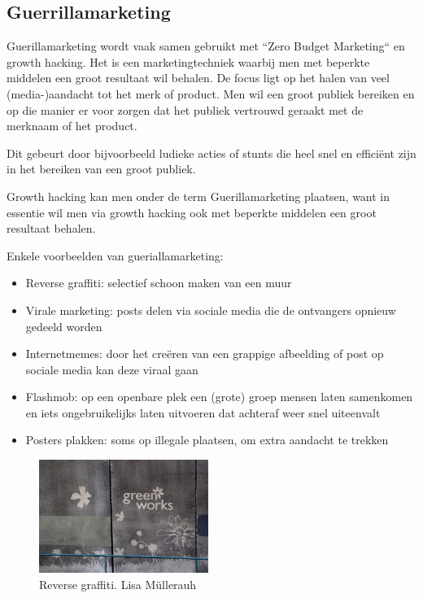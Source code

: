 \subsection{Guerrillamarketing} \label{subsec:guerrillamarketing}
Guerillamarketing wordt vaak samen gebruikt met ``Zero Budget Marketing`` en growth hacking. Het is een marketingtechniek waarbij men met beperkte middelen een groot resultaat wil behalen. De focus ligt op het halen van veel (media-)aandacht tot het merk of product. Men wil een groot publiek bereiken en op die manier er voor zorgen dat het publiek vertrouwd geraakt met de merknaam of het product.

Dit gebeurt door bijvoorbeeld ludieke acties of stunts die heel snel en efficiënt zijn in het bereiken van een groot publiek. 

Growth hacking kan men onder de term Guerillamarketing plaatsen, want in essentie wil men via growth hacking ook met beperkte middelen een groot resultaat behalen.

Enkele voorbeelden van gueriallamarketing:
 
\begin{itemize}
	\item Reverse graffiti: selectief schoon maken van een muur 
	\item Virale marketing: posts delen via sociale media die de ontvangers opnieuw gedeeld worden
	\item Internetmemes: door het creëren van een grappige afbeelding of post op sociale media kan deze viraal gaan
	\item Flashmob: op een openbare plek een (grote) groep mensen laten samenkomen en iets ongebruikelijks laten uitvoeren dat achteraf weer snel uiteenvalt
	\item Posters plakken: soms op illegale plaatsen, om extra aandacht te trekken
\end{itemize}

\begin{figure}[h!]
	\includegraphics[width=55mm]{img/reverse-graffiti.jpg}
	\centering
	\caption{Reverse graffiti. \textcopyright  Lisa Müllerauh}
	\label{fig:defGrowthHacker}
\end{figure}

